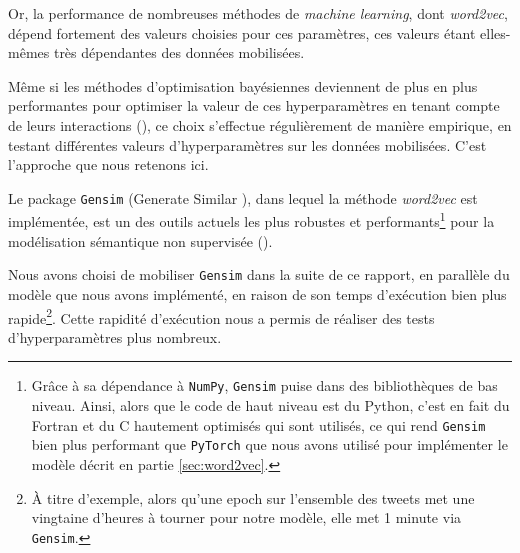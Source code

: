 \documentclass[11pt,french,french]{article}
\let\rmarkdownfootnote\footnote%
\def\footnote{\protect\rmarkdownfootnote}
\begin{document}
Or, la performance de nombreuses méthodes de \emph{machine learning}, dont \emph{word2vec}, dépend fortement des valeurs choisies pour ces paramètres, ces valeurs étant elles-mêmes très dépendantes des données mobilisées.

Même si les méthodes d'optimisation bayésiennes deviennent de plus en plus performantes pour optimiser la valeur de ces hyperparamètres en tenant compte de leurs interactions (\cite{Hutter}), ce choix s'effectue régulièrement de manière empirique, en testant différentes valeurs d'hyperparamètres sur les données mobilisées.
C'est l'approche que nous retenons ici.

Le package \texttt{Gensim} (\og Generate Similar \fg{}), dans lequel la méthode \emph{word2vec} est implémentée, est un des outils actuels les plus robustes et performants\footnote{Grâce à sa dépendance à \texttt{NumPy}, \texttt{Gensim} puise dans des bibliothèques de bas niveau.
  Ainsi, alors que le code de haut niveau est du Python, c'est en fait du Fortran et du C hautement optimisés qui sont utilisés, ce qui rend \texttt{Gensim} bien plus performant que \texttt{PyTorch} que nous avons utilisé pour implémenter le modèle décrit en partie \ref{sec:word2vec}.}
pour la modélisation sémantique non supervisée (\cite{Rehurek}).

Nous avons choisi de mobiliser \texttt{Gensim} dans la suite de ce rapport, en parallèle du modèle que nous avons implémenté, en raison de son temps d'exécution bien plus rapide\footnote{À titre d'exemple, alors qu'une epoch sur l'ensemble des tweets met une vingtaine d'heures à tourner pour \og notre \fg{} modèle, elle met 1 minute via \texttt{Gensim}.}. Cette rapidité d'exécution nous a permis de réaliser des tests d'hyperparamètres plus nombreux.
\end{document}
